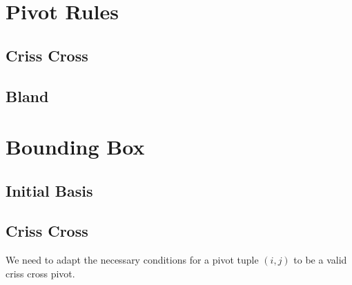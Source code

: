 \documentclass[]{article}
\theoremstyle{definition}
\theoremstyle{remark}
\begin{document}
\section{Pivot Rules}
\subsection{Criss Cross}
\subsection{Bland}
\section{Bounding Box}
\subsection{Initial Basis}
\subsection{Criss Cross}
We need to adapt the necessary conditions for a pivot tuple $(i, j)$ to be a valid criss cross pivot.
\end{document}
